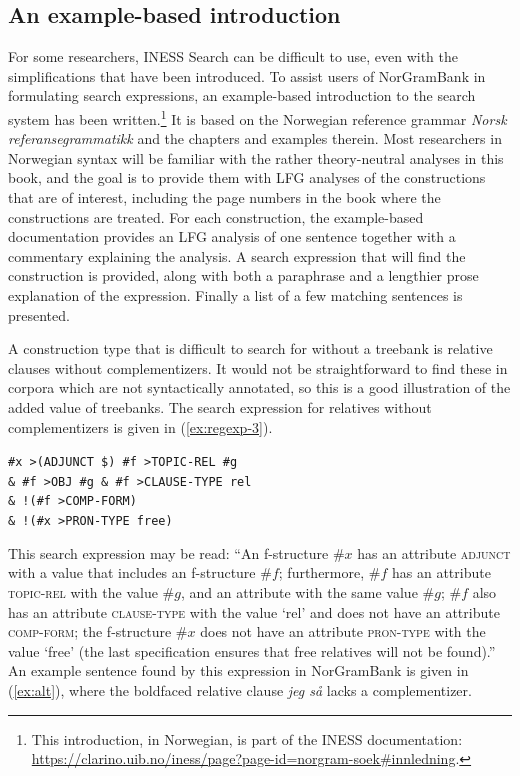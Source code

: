 \documentclass[output=paper,hidelinks]{langscibook}
\begin{document}
\subsection{An example-based introduction}

For some researchers, INESS Search can be difficult to use, even with the simplifications that have been introduced.
To assist users of NorGramBank in formulating search expressions, an example-based introduction to the search system has been written.\footnote{This introduction, in Norwegian, is part of the INESS documentation: \url{https://clarino.uib.no/iness/page?page-id=norgram-soek\#innledning}.}
It is based on the Norwegian reference grammar \textit{Norsk referansegrammatikk} \citep{Faarlund97nrg} and the chapters and examples therein.
Most researchers in Norwegian syntax will be familiar with the rather theory-neutral analyses in this book, and the goal is to provide them with LFG analyses of the constructions that are of interest, including the page numbers in the book where the constructions are treated.
For each construction, the example-based documentation provides an LFG analysis of one sentence together with a commentary explaining the analysis.
A search expression that will find the construction is provided, along with both a paraphrase and a lengthier prose explanation of the expression.
Finally a list of a few matching sentences is presented.

A construction type that is difficult to search for without a treebank is relative clauses without complementizers. %
It would not be straightforward to find these in corpora which are not syntactically annotated, so this is a good illustration of the added value of treebanks. %
The search expression for relatives without complementizers is given in (\ref{ex:regexp-3}).

\ea
\label{ex:regexp-3}
\texttt{\#x >(ADJUNCT \$) \#f >TOPIC-REL \#g \\
\& \#f >OBJ \#g \& \#f >CLAUSE-TYPE \textquotesingle rel\textquotesingle \\
\& !(\#f >COMP-FORM) \\
\& !(\#x >PRON-TYPE \textquotesingle free\textquotesingle)}
\z

This search expression may be read: ``An f-structure $\#x$ has an attribute \textsc{adjunct} with a value that includes an f-structure $\#f$; furthermore, $\#f$ has an attribute \textsc{topic-rel} with the value $\#g$, and an attribute \OBJ with the same value $\#g$; $\#f$ also has an attribute \textsc{clause-type} with the value `rel' and does not have an attribute \textsc{comp-form}; the f-structure $\#x$ does not have an attribute \textsc{pron-type} with the value `free' (the last specification ensures that free relatives will not be found).''
An example sentence found by this expression in NorGramBank is given in (\ref{ex:alt}), where the boldfaced relative clause \textit{jeg så} lacks a complementizer. %
\end{document}
